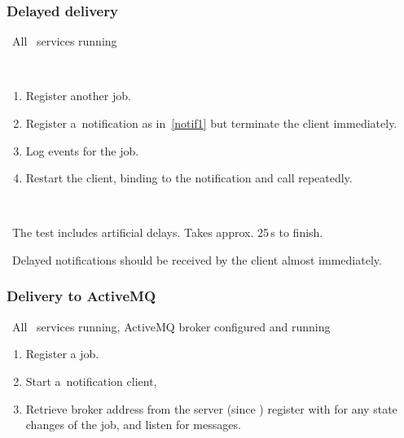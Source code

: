 



\subsubsection{Delayed delivery}

\req\ All \LB\ services running

\what\
\begin{enumerate}
\item Register another job.
\item Register a~notification as in~\ref{notif1} but terminate the client
immediately.
\item Log events for the job.
\item Restart the client, binding to the notification and call
 repeatedly.
\end{enumerate}

\how\ 

\note\ The test includes artificial delays. Takes approx. 25\,s to finish.

\result\ Delayed notifications should be received by the client almost
immediately.


\subsubsection{Delivery to ActiveMQ}
\label{notifamq}
\req\ All \LB\ services running, ActiveMQ broker configured and running

\what
\begin{enumerate}
\item Register a job.
\item Start a~notification client,
\item Retrieve broker address from the server (since )
register with \code{edg\_wll\_NotifNew} for any state changes of the job,
and listen for messages. 
\end{enumerate}

\how\ 

